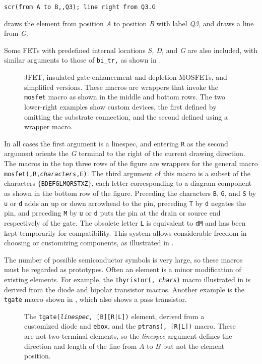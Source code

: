 {\tt scr(from A to B,{,}Q3); line right from Q3.G}

\noindent
draws the element from position {\sl A} to position {\sl B} with label
{\sl Q3}, and draws a line from {\sl G}.

Some FETs with predefined internal locations {\sl S,} {\sl D,} and {\sl G} are
also included, with similar arguments to those of {\tt bi\_tr,} as shown in
.
\begin{figure}[ht]
   
   \caption{JFET, insulated-gate enhancement and depletion MOSFETs,
     and simplified versions.
     These macros are wrappers that invoke the {\tt mosfet}
     macro as shown in the middle and bottom rows.
     The two lower-right examples show custom devices, the first
     defined by omitting the substrate connection, and the second
     defined using a wrapper macro.}
   \label{fet}
   \end{figure}
In all cases the first argument is a linespec,
and entering
{\tt R} as the second argument orients the {\sl G} terminal to the right of the
current drawing direction.
The macros in the top three rows of the figure are wrappers for the
general macro {\tt mosfet(\linespec,R,{\sl characters},E)}.
The third argument of this macro is a subset of the characters
$\{${\tt BDEFGLMQRSTXZ}$\}$, each letter corresponding to
a diagram component as shown in the bottom row of the figure. 
Preceding the characters {\tt B}, {\tt G}, and {\tt S} by {\tt u} or {\tt d}
adds an up or down arrowhead to the pin, preceding {\tt T} by {\tt d}
negates the pin, and preceding {\tt M} by {\tt u} or {\tt d} puts the pin
at the drain or source end respectively of the gate.
The obsolete letter {\tt L} is equivalent to {\tt dM} and has been kept
temporarily for compatibility.
This system allows considerable freedom in choosing or customizing components,
as illustrated in .

The number of possible semiconductor symbols is very
large, so these macros must be regarded as prototypes.
Often an element is a minor modification of existing elements.  For example,
the {\tt thyristor(\linespec, {\sl chars})} macro illustrated in
 is derived from the diode and bipolar transistor macros.
Another example is the {\tt tgate} macro shown in , which
also shows a pass transistor.
\begin{figure}[ht]
   
   \caption{The {\tt tgate({\sl linespec,} [B][R|L])} element, derived from
     a customized diode and {\tt ebox}, and the
     {\tt ptrans(\linespec, [R|L])} macro.
     These are not two-terminal elements, so the {\sl linespec} argument
     defines the direction and length of the line from $A$ to $B$ but not
     the element position.}
   \label{Tgate}
   \end{figure}


